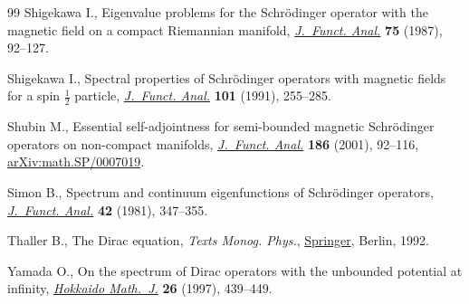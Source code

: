 \documentclass[pdftex]{sigma}
\numberwithin{equation}{section}
\begin{document}
\begin{thebibliography}{99}
Shigekawa I., Eigenvalue problems for the {S}chr\"odinger operator with the
 magnetic field on a compact {R}iemannian manifold, \href{https://doi.org/10.1016/0022-1236(87)90108-X}{\textit{J.~Funct. Anal.}}
 \textbf{75} (1987), 92--127.

Shigekawa I., Spectral properties of {S}chr\"odinger operators with magnetic
 fields for a spin {$\frac12$} particle, \href{https://doi.org/10.1016/0022-1236(91)90158-2}{\textit{J.~Funct. Anal.}} \textbf{101}
 (1991), 255--285.

Shubin M., Essential self-adjointness for semi-bounded magnetic {S}chr\"odinger
 operators on non-compact manifolds, \href{https://doi.org/10.1006/jfan.2001.3778}{\textit{J.~Funct. Anal.}} \textbf{186}
 (2001), 92--116, \href{https://arxiv.org/abs/math.SP/0007019}{arXiv:math.SP/0007019}.

Simon B., Spectrum and continuum eigenfunctions of {S}chr\"odinger operators,
 \href{https://doi.org/10.1016/0022-1236(81)90094-X}{\textit{J.~Funct. Anal.}} \textbf{42} (1981), 347--355.

Thaller B., The {D}irac equation, \textit{Texts Monog. Phys.}, \href{https://doi.org/10.1007/978-3-662-02753-0}{Springer}, Berlin, 1992.

Yamada O., On the spectrum of {D}irac operators with the unbounded potential at
 infinity, \href{https://doi.org/10.14492/hokmj/1351257976}{\textit{Hokkaido Math.~J.}} \textbf{26} (1997), 439--449.

\end{thebibliography}\LastPageEnding
\end{document}
